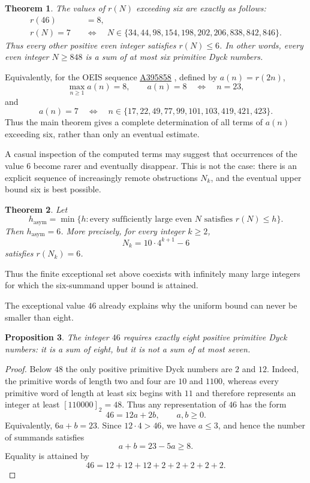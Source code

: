 \documentclass[12pt]{article}
\theoremstyle{plain}
\newtheorem{theorem}{Theorem}
\newtheorem{proposition}[theorem]{Proposition}
\theoremstyle{definition}
\theoremstyle{plain}
\newcommand{\seqnum}[1]{\href{https://oeis.org/#1}{\rm \underline{#1}}}
\begin{document}
\begin{theorem}\label{thm:classification}
The values of $r(N)$ exceeding six are exactly as follows:
\[
\begin{aligned}
 r(46)&=8,\\[4pt]
 r(N)=7\quad&\Longleftrightarrow\quad
 N\in\{34,44,98,154,198,202,206,838,842,846\}.
\end{aligned}
\]
Thus every other positive even integer satisfies $r(N)\leq6$.  In other
words, every even integer $N\geq848$ is a sum of at most six primitive
Dyck numbers.
\end{theorem}

Equivalently, for the OEIS sequence \seqnum{A395858}
\cite{OEIS-A395858}, defined by $a(n)=r(2n)$,
\[
        \max_{n\geq1}a(n)=8,
        \qquad
        a(n)=8\quad\Longleftrightarrow\quad n=23,
\]
and
\[
 a(n)=7
 \quad\Longleftrightarrow\quad
 n\in\{17,22,49,77,99,101,103,419,421,423\}.
\]
Thus the main theorem gives a complete determination of all terms of
$a(n)$ exceeding six, rather than only an eventual estimate.


A casual inspection of the computed terms may suggest that occurrences of
the value $6$ become rarer and eventually disappear.  This is not the case:
there is an explicit sequence of increasingly remote obstructions $N_k$, and
the eventual upper bound six is best possible.

\begin{theorem}\label{thm:asymptotic-order}
Let
\[
 h_{\mathrm{asym}}
 =\min\{h:\text{every sufficiently large even }N\text{ satisfies }r(N)\leq h\}.
\]
Then $h_{\mathrm{asym}}=6$.  More precisely, for every integer $k\geq2$,
\[
 N_k=10\cdot4^{k+1}-6
\]
satisfies $r(N_k)=6$.
\end{theorem}

Thus the finite exceptional set above coexists with infinitely many large
integers for which the six-summand upper bound is attained.

The exceptional value $46$ already explains why the uniform bound can
never be smaller than eight.

\begin{proposition}\label{prop:46}
The integer $46$ requires exactly eight positive primitive Dyck numbers:
it is a sum of eight, but it is not a sum of at most seven.
\end{proposition}

\begin{proof}
Below $48$ the only positive primitive Dyck numbers are $2$ and $12$.
Indeed, the primitive words of length two and four are $10$ and $1100$,
whereas every primitive word of length at least six begins with $11$ and
therefore represents an integer at least $[110000]_2=48$.  Thus any
representation of $46$ has the form
\[
        46=12a+2b,\qquad a,b\geq0.
\]
Equivalently, $6a+b=23$.  Since $12\cdot4>46$, we have $a\leq3$, and
hence the number of summands satisfies
\[
        a+b=23-5a\geq8.
\]
Equality is attained by
\[
        46=12+12+12+2+2+2+2+2.
\]
\end{proof}
\end{document}
